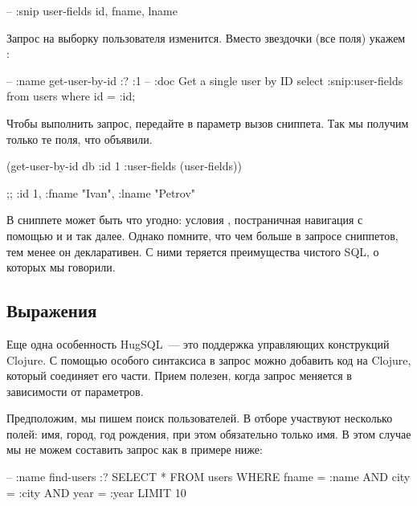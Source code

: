 \begin{english}
  \begin{sql}
-- :snip user-fields
id, fname, lname
  \end{sql}
\end{english}

Запрос на выборку пользователя изменится. Вместо звездочки (все поля) укажем :

\begin{english}
  \begin{sql}
-- :name get-user-by-id :? :1
-- :doc Get a single user by ID
select :snip:user-fields from users
where id = :id;
  \end{sql}
\end{english}

Чтобы выполнить запрос, передайте в параметр  вызов сниппета. Так мы получим только те поля, что объявили.

\begin{english}
  \begin{clojure}
(get-user-by-id db {:id 1 :user-fields (user-fields)})

;; {:id 1, :fname "Ivan", :lname "Petrov"}
  \end{clojure}
\end{english}

В сниппете может быть что угодно: условия , постраничная навигация с помощью  и  и так далее. Однако помните, что чем больше в запросе сниппетов, тем менее он декларативен. С ними теряется преимущества чистого SQL, о которых мы говорили.

\subsection{Выражения}

Еще одна особенность HugSQL~--- это поддержка управляющих конструкций Clojure. С помощью особого синтаксиса в запрос можно добавить код на Clojure, который соединяет его части. Прием полезен, когда запрос меняется в зависимости от параметров.

Предположим, мы пишем поиск пользователей. В отборе участвуют несколько полей: имя, город, год рождения, при этом обязательно только имя. В этом случае мы не можем составить запрос как в примере ниже:

\begin{english}
  \begin{sql}
-- :name find-users :?
SELECT * FROM users
WHERE fname = :name
  AND city = :city
  AND year = :year
LIMIT 10
  \end{sql}
\end{english}

